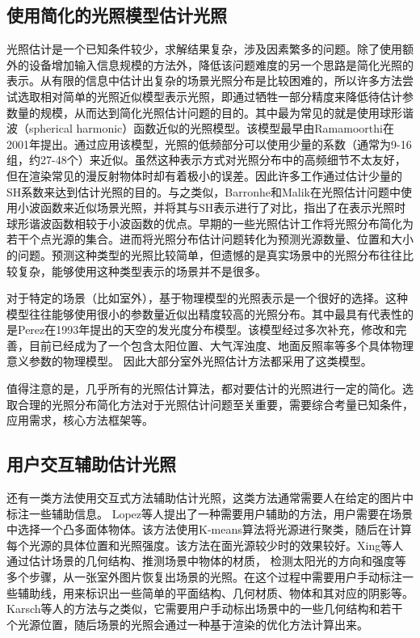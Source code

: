 \subsection{使用简化的光照模型估计光照}
光照估计是一个已知条件较少，求解结果复杂，涉及因素繁多的问题。除了使用额外的设备增加输入信息规模的方法外，降低该问题难度的另一个思路是简化光照的表示。从有限的信息中估计出复杂的场景光照分布是比较困难的，所以许多方法尝试选取相对简单的光照近似模型表示光照，即通过牺牲一部分精度来降低待估计参数量的规模，从而达到简化光照估计问题的目的。其中最为常见的就是使用球形谐波（spherical harmonic）函数近似的光照模型。该模型最早由Ramamoorthi\cite{ramamoorthi2001efficient}在2001年提出。通过应用该模型，光照的低频部分可以使用少量的系数（通常为9-16组，约27-48个）来近似。虽然这种表示方式对光照分布中的高频细节不太友好，但在渲染常见的漫反射物体时却有着极小的误差。因此许多工作\cite{ramamoorthi2001signal,kemelmacher20113d,garrido2013reconstructing,knorr2014real,li2014intrinsic,barron2015shape}通过估计少量的SH系数来达到估计光照的目的。与之类似，Barronhe和Malik\cite{okabe2004spherical}在光照估计问题中使用小波函数来近似场景光照，并将其与SH表示进行了对比，指出了在表示光照时球形谐波函数相较于小波函数的优点。早期的一些光照估计工作\cite{sato1999acquiring,  panagopoulos2011illumination, wang2002estimation, li2003multiple, sato2003illumination}将光照分布简化为若干个点光源的集合。进而将光照分布估计问题转化为预测光源数量、位置和大小的问题。预测这种类型的光照比较简单，但遗憾的是真实场景中的光照分布往往比较复杂，能够使用这种类型表示的场景并不是很多。

对于特定的场景（比如室外），基于物理模型的光照表示是一个很好的选择。这种模型往往能够使用很小的参数量近似出精度较高的光照分布。其中最具有代表性的是Perez\cite{perez1993all}在1993年提出的天空的发光度分布模型。该模型经过多次补充，修改和完善\cite{nishita1996display, sirai1993display,preetham1999practical,raab2008unbiased,hosek2012analytic, hovsekhovsek2013adding}，目前已经成为了一个包含太阳位置、大气浑浊度、地面反照率等多个具体物理意义参数的物理模型。
因此大部分室外光照估计方法\cite{lalonde2008does, lalonde2010sun, lalonde2012estimating, sunkavalli2008color}都采用了这类模型。

值得注意的是，几乎所有的光照估计算法，都对要估计的光照进行一定的简化。选取合理的光照分布简化方法对于光照估计问题至关重要，需要综合考量已知条件，应用需求，核心方法框架等。

\subsection{用户交互辅助估计光照}
还有一类方法使用交互式方法辅助估计光照，这类方法通常需要人在给定的图片中标注一些辅助信息。
Lopez等人\cite{lopez2010compositing}提出了一种需要用户辅助的方法，用户需要在场景中选择一个凸多面体物体。该方法使用K-means算法将光源进行聚类，随后在计算每个光源的具体位置和光照强度。该方法在面光源较少时的效果较好。Xing等人\cite{xing2013lighting}通过估计场景的几何结构、推测场景中物体的材质， 检测太阳光的方向和强度等多个步骤，从一张室外图片恢复出场景的光照。在这个过程中需要用户手动标注一些辅助线，用来标识出一些简单的平面结构、几何材质、物体和其对应的阴影等。Karsch等人\cite{karsch2011rendering}的方法与之类似，它需要用户手动标出场景中的一些几何结构和若干个光源位置，随后场景的光照会通过一种基于渲染的优化方法计算出来。

